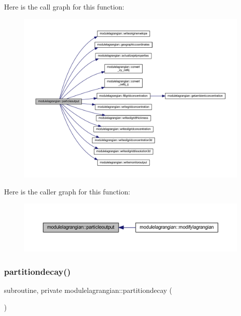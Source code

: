 Here is the call graph for this function\+:\nopagebreak
\begin{figure}[H]
\begin{center}
\leavevmode
\includegraphics[width=350pt]{namespacemodulelagrangian_aa775be66f039a949bf0d897457b63cab_cgraph}
\end{center}
\end{figure}
Here is the caller graph for this function\+:\nopagebreak
\begin{figure}[H]
\begin{center}
\leavevmode
\includegraphics[width=350pt]{namespacemodulelagrangian_aa775be66f039a949bf0d897457b63cab_icgraph}
\end{center}
\end{figure}
\mbox{\label{namespacemodulelagrangian_ad1541366b9db02d7a143f29f81d45a3d}} 
\subsubsection{\texorpdfstring{partitiondecay()}{partitiondecay()}}
{\footnotesize\ttfamily subroutine, private modulelagrangian\+::partitiondecay (\begin{DoxyParamCaption}{ }\end{DoxyParamCaption})\hspace{0.3cm}{\ttfamily [private]}}

